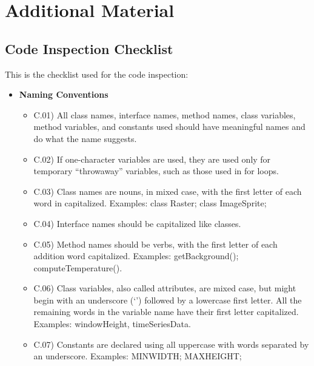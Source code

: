 \documentclass[../../codeInspection.tex]{subfiles}
\begin{document}
	\chapter{Additional Material}

		\section{Code Inspection Checklist}

			This is the checklist used for the code inspection:

			\begin{itemize}
				
				\item  	\textbf{Naming Conventions}
						\begin{itemize}

					  		\item C.01) All class names, interface names, method names, class variables, method variables, and constants used should have meaningful names and do what the name suggests.

					  		\item C.02) If one-character variables are used, they are used only for temporary “throwaway” variables, such as those used in for loops.

					  		\item C.03) Class names are nouns, in mixed case, with the first letter of each word in capitalized. Examples: class Raster; class ImageSprite;

					  		\item C.04) Interface names should be capitalized like classes.

					  		\item C.05) Method names should be verbs, with the first letter of each addition word capitalized. Examples: getBackground(); computeTemperature().

					  		\item C.06) Class variables, also called attributes, are mixed case, but might begin with an underscore (‘\textunderscore’) followed by a lowercase first letter. All the remaining words in the variable name have their first letter capitalized. Examples: \textunderscore windowHeight, timeSeriesData.

					  		\item C.07) Constants are declared using all uppercase with words separated by an underscore. Examples: MIN\textunderscore WIDTH; MAX\textunderscore HEIGHT;


\end{itemize}
\end{itemize}
\end{document}
